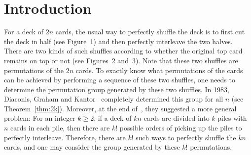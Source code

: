 \documentclass[11pt,a4paper,reqno]{amsart}
\theoremstyle{definition}
\begin{document}
\begin{abstract}
For positive integers $k$ and $n$, the shuffle group $G_{k,kn}$ is generated by the $k!$ permutations of a deck of $kn$ cards performed by cutting the deck into $k$ piles with $n$ cards in each pile, and then perfectly interleaving these cards following a certain permutation of the $k$ piles. For $k=2$, the shuffle group $G_{2,2n}$ was determined by Diaconis, Graham and Kantor in 1983. The Shuffle Group Conjecture states that, for general $k$, the shuffle group $G_{k,kn}$ contains $\mathrm{A}_{kn}$ whenever $k\notin\{2,4\}$ and $n$ is not a power of $k$. In particular, the conjecture in the case $k=3$ was posed by Medvedoff and Morrison in 1987. The only values of $k$ for which the Shuffle Group Conjecture has been confirmed so far are powers of $2$, due to recent work of Amarra, Morgan and Praeger based on Classification of Finite Simple Groups. In this paper, we confirm the Shuffle Group Conjecture for all cases using results on $2$-transitive groups and elements of large fixed point ratio in primitive groups.

\textit{Key words:} perfect shuffle, shuffle group, $2$-transitive permutation group, fixed point ratio.

\textit{MSC2020:} 20B35
\end{abstract}
\maketitle




\section{Introduction}\label{sec1}

For a deck of $2n$ cards, the usual way to perfectly shuffle the deck is to first cut the deck in half (see Figure~1) and then perfectly interleave the two halves.
There are two kinds of such shuffles according to whether the original top card remains on top or not (see Figures~2 and~3).
Note that these two shuffles are permutations of the $2n$ cards. To exactly know what permutations of the cards can be achieved by performing a sequence of these two shuffles, one needs to determine the permutation group generated by these two shuffles.
In 1983, Diaconis, Graham and Kantor~\cite{DGK1983} completely determined this group for all $n$ (see Theorem~\ref{thm:2k}).
Moreover, at the end of~\cite{DGK1983}, they suggested a more general problem: For an integer $k\geq2$, if a deck of $kn$ cards are divided into $k$ piles with $n$ cards in each pile, then there are $k!$ possible orders of picking up the piles to perfectly interleave. Therefore, there are $k!$ such ways to perfectly shuffle the $kn$ cards, and one may consider the group generated by these $k!$ permutations.
\end{document}
